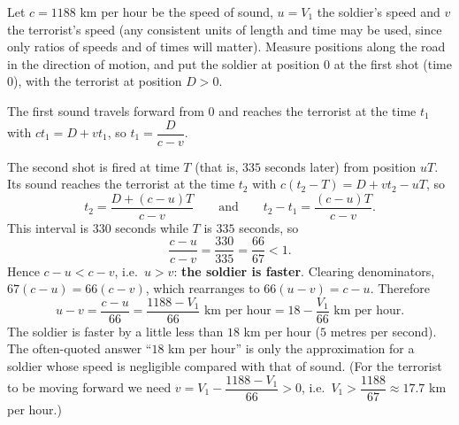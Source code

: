 Let $c=1188$ km per hour be the speed of sound, $u=V_1$ the soldier's speed and $v$ the terrorist's speed (any consistent units of length and time may be used, since only ratios of speeds and of times will matter). Measure positions along the road in the direction of motion, and put the soldier at position $0$ at the first shot (time $0$), with the terrorist at position $D>0$.

The first sound travels forward from $0$ and reaches the terrorist at the time $t_1$ with $ct_1=D+vt_1$, so $t_1=\dfrac{D}{c-v}$.

The second shot is fired at time $T$ (that is, $335$ seconds later) from position $uT$. Its sound reaches the terrorist at the time $t_2$ with $c(t_2-T)=D+vt_2-uT$, so
\[
t_2=\dfrac{D+(c-u)T}{c-v}\qquad\text{and}\qquad t_2-t_1=\dfrac{(c-u)T}{c-v}.
\]
This interval is $330$ seconds while $T$ is $335$ seconds, so
\[
\dfrac{c-u}{c-v}=\dfrac{330}{335}=\dfrac{66}{67}<1 .
\]
Hence $c-u<c-v$, i.e.\ $u>v$: \textbf{the soldier is faster}. Clearing denominators, $67(c-u)=66(c-v)$, which rearranges to $66(u-v)=c-u$. Therefore
\[
u-v=\dfrac{c-u}{66}=\boxed{\dfrac{1188-V_1}{66}\text{ km per hour}=18-\dfrac{V_1}{66}\text{ km per hour}}.
\]
The soldier is faster by a little less than $18$ km per hour ($5$ metres per second). The often-quoted answer ``$18$ km per hour'' is only the approximation for a soldier whose speed is negligible compared with that of sound. (For the terrorist to be moving forward we need $v=V_1-\dfrac{1188-V_1}{66}>0$, i.e.\ $V_1>\dfrac{1188}{67}\approx17.7$ km per hour.)
